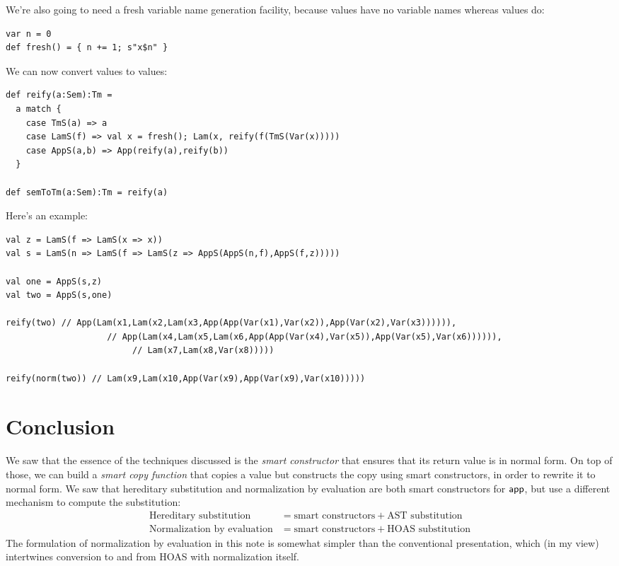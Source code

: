 We're also going to need a fresh variable name generation facility, because  values have no variable names whereas  values do:

\begin{lstlisting}
var n = 0
def fresh() = { n += 1; s"x$n" }
\end{lstlisting}

We can now convert  values to  values:

\begin{lstlisting}
def reify(a:Sem):Tm =
  a match {
    case TmS(a) => a
    case LamS(f) => val x = fresh(); Lam(x, reify(f(TmS(Var(x)))))
    case AppS(a,b) => App(reify(a),reify(b))
  }

def semToTm(a:Sem):Tm = reify(a)
\end{lstlisting}

Here's an example:

\begin{lstlisting}
val z = LamS(f => LamS(x => x))
val s = LamS(n => LamS(f => LamS(z => AppS(AppS(n,f),AppS(f,z)))))

val one = AppS(s,z)
val two = AppS(s,one)

reify(two) // App(Lam(x1,Lam(x2,Lam(x3,App(App(Var(x1),Var(x2)),App(Var(x2),Var(x3)))))),
                    // App(Lam(x4,Lam(x5,Lam(x6,App(App(Var(x4),Var(x5)),App(Var(x5),Var(x6)))))),
                         // Lam(x7,Lam(x8,Var(x8)))))

reify(norm(two)) // Lam(x9,Lam(x10,App(Var(x9),App(Var(x9),Var(x10)))))
\end{lstlisting}

\section{Conclusion}

We saw that the essence of the techniques discussed is the \emph{smart constructor} that ensures that its return value is in normal form.
On top of those, we can build a \emph{smart copy function} that copies a value but constructs the copy using smart constructors, in order to rewrite it to normal form.
We saw that hereditary substitution and normalization by evaluation are both smart constructors for $\mathsf{app}$, but use a different mechanism to compute the substitution:
\begin{align*}
  \text{Hereditary substitution} &= \text{smart constructors} + \text{AST substitution} \\
  \text{Normalization by evaluation} &= \text{smart constructors} + \text{HOAS substitution}
\end{align*}
The formulation of normalization by evaluation in this note is somewhat simpler than the conventional presentation, which (in my view) intertwines conversion to and from HOAS with normalization itself.





